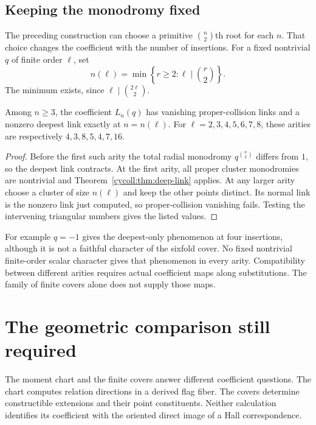 \subsection{Keeping the monodromy fixed}

The preceding construction can choose a primitive
$\binom n2$th root for each $n$. That choice changes
the coefficient with the number of insertions.
For a fixed nontrivial $q$ of finite order $\ell$, set
\begin{equation}\label{cycoll:eq:first-arity}
 n(\ell)=\min\left\{r\geq2:\ell\mid\binom r2\right\}.
\end{equation}
The minimum exists, since $\ell\mid\binom{2\ell}{2}$.

\begin{corollary}\label{cycoll:cor:first-arity}
Among $n\geq3$, the coefficient $L_n(q)$ has vanishing
proper-collision links and a nonzero deepest link exactly
at $n=n(\ell)$. For $\ell=2,3,4,5,6,7,8$, these arities
are respectively $4,3,8,5,4,7,16$.
\end{corollary}
\begin{proof}
Before the first such arity the total radial monodromy
$q^{\binom n2}$ differs from $1$, so the deepest link
contracts. At the first arity, all proper cluster
monodromies are nontrivial and
Theorem~\ref{cycoll:thm:deep-link} applies.
At any larger arity choose a cluster of size $n(\ell)$
and keep the other points distinct. Its normal link is
the nonzero link just computed, so proper-collision
vanishing fails. Testing the intervening triangular
numbers gives the listed values.
\end{proof}

For example $q=-1$ gives the deepest-only phenomenon
at four insertions, although it is not a faithful
character of the sixfold cover. No fixed nontrivial
finite-order scalar character gives that phenomenon
in every arity. Compatibility between different arities
requires actual coefficient maps along substitutions.
The family of finite covers alone does not supply those maps.

\section{The geometric comparison still required}
\label{cycoll:sec:comparison}

The moment chart and the finite covers answer different
coefficient questions. The chart computes relation
directions in a derived flag fiber. The covers determine
constructible extensions and their point constituents.
Neither calculation identifies its coefficient with the
oriented direct image of a Hall correspondence.

